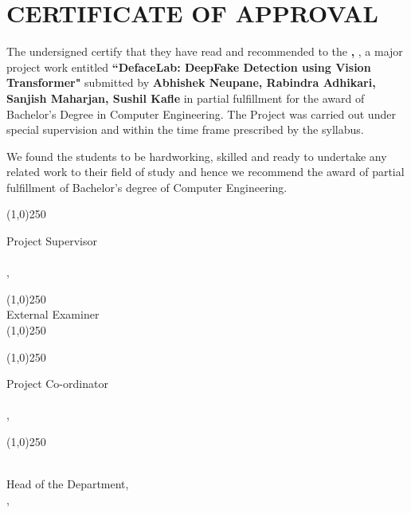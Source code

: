 \section*{CERTIFICATE OF APPROVAL}
\begingroup
\setlength{\parskip}{0pt}

The undersigned certify that they have read and recommended to the \textbf{\thedepartment,  \thecampus}, a major
project work entitled \textbf{“DefaceLab:  DeepFake Detection using Vision Transformer"} submitted by \textbf{Abhishek Neupane, Rabindra Adhikari, Sanjish Maharjan, Sushil Kafle} in partial fulfillment for the award of Bachelor’s
Degree in Computer Engineering. The Project was carried out
under special supervision and within the time frame prescribed by the syllabus.

\vspace{0.7cm}

\noindent We found the students to be hardworking, skilled and ready to undertake any related
work to their field of study and hence we recommend the award of partial fulfillment
of Bachelor’s degree of Computer Engineering.

\vspace{0.7cm}

\noindent \line(1,0){250}

\noindent Project Supervisor \\
\thesupervisor \\
\thedepartment, \thecampus


\vspace{0.5cm}
\noindent \line(1,0){250}\\
\noindent External Examiner \\

\noindent \line(1,0){250}\\

\vspace{0.3cm}

\noindent \line(1,0){250}

\noindent Project Co-ordinator \\
\theprogramcoordinator \\
\thedepartment, \thecampus

\vspace{0.4cm}

\noindent \line(1,0){250}

\noindent \theHOD \\
Head of the Department, \\
\thedepartment, \thecampus

\vspace{0.3cm}

\noindent \thedate
\endgroup